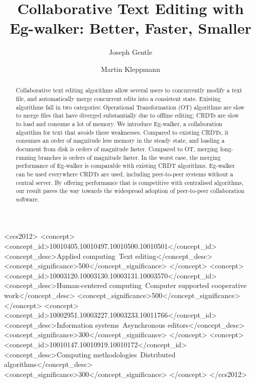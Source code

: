 \documentclass[sigplan,10pt]{acmart}
\newcommand{\algname}{Eg-walker\xspace}
\begin{document}
\def\sectionautorefname{Section}%
\def\subsectionautorefname{Section}%
\def\subsubsectionautorefname{Section}%

\title{Collaborative Text Editing with Eg-walker: Better, Faster, Smaller}
\author{Joseph Gentle}

\author{Martin Kleppmann}

\begin{abstract}
  Collaborative text editing algorithms allow several users to concurrently modify a text file, and automatically merge concurrent edits into a consistent state.
  Existing algorithms fall in two categories: Operational Transformation (OT) algorithms are slow to merge files that have diverged substantially due to offline editing; CRDTs are slow to load and consume a lot of memory.
  We introduce \algname, a collaboration algorithm for text that avoids these weaknesses.
  Compared to existing CRDTs, it consumes an order of magnitude less memory in the steady state, and loading a document from disk is orders of magnitude faster.
  Compared to OT, merging long-running branches is orders of magnitude faster.
  In the worst case, the merging performance of \algname is comparable with existing CRDT algorithms.
  \algname can be used everywhere CRDTs are used, including peer-to-peer systems without a central server.
  By offering performance that is competitive with centralised algorithms, our result paves the way towards the widespread adoption of peer-to-peer collaboration software.
\end{abstract}

\begin{CCSXML}
  <ccs2012>
    <concept>
      <concept_id>10010405.10010497.10010500.10010501</concept_id>
      <concept_desc>Applied computing~Text editing</concept_desc>
      <concept_significance>500</concept_significance>
    </concept>
    <concept>
      <concept_id>10003120.10003130.10003131.10003570</concept_id>
      <concept_desc>Human-centered computing~Computer supported cooperative work</concept_desc>
      <concept_significance>500</concept_significance>
    </concept>
    <concept>
      <concept_id>10002951.10003227.10003233.10011766</concept_id>
      <concept_desc>Information systems~Asynchronous editors</concept_desc>
      <concept_significance>300</concept_significance>
    </concept>
    <concept>
      <concept_id>10010147.10010919.10010172</concept_id>
      <concept_desc>Computing methodologies~Distributed algorithms</concept_desc>
      <concept_significance>300</concept_significance>
    </concept>
  </ccs2012>
\end{CCSXML}
\end{document}
